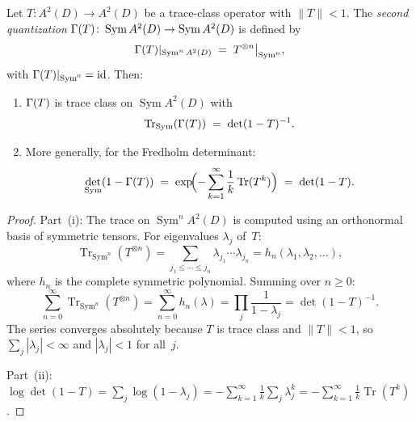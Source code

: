 \begin{proposition}%
\label{prop:thqg-X-second-quantization}%
%
Let $T \colon A^2(D) \to A^2(D)$ be a trace-class operator
with $\|T\| < 1$. The \emph{second quantization}
$\Gamma(T) \colon \operatorname{Sym} A^2(D) \to
\operatorname{Sym} A^2(D)$ is defined by
\begin{equation}\label{eq:thqg-X-second-quant}
\Gamma(T)|_{\operatorname{Sym}^n A^2(D)}
\;=\;
T^{\otimes n}\big|_{\operatorname{Sym}^n},
\end{equation}
with $\Gamma(T)|_{\operatorname{Sym}^0} = \mathrm{id}$.
Then:
\begin{enumerate}[label=\textup{(\roman*)}]
\item $\Gamma(T)$ is trace class on $\operatorname{Sym} A^2(D)$
 with
 \begin{equation}\label{eq:thqg-X-second-quant-trace}
 \operatorname{Tr}_{\operatorname{Sym}}(\Gamma(T))
 \;=\;
 \det(1 - T)^{-1}.
 \end{equation}
\item More generally, for the Fredholm determinant:
 \begin{equation}\label{eq:thqg-X-fredholm-second-quant}
 \det_{\operatorname{Sym}}(1 - \Gamma(T))
 \;=\;
 \exp\!\Bigl(-\sum_{k=1}^{\infty}
 \frac{1}{k}\operatorname{Tr}(T^k)\Bigr)
 \;=\;
 \det(1 - T).
 \end{equation}
\end{enumerate}
\end{proposition}

\begin{proof}
Part~(i): The trace on $\operatorname{Sym}^n A^2(D)$ is computed
using an orthonormal basis of symmetric tensors.
For eigenvalues $\lambda_j$ of~$T$:
\[
\operatorname{Tr}_{\operatorname{Sym}^n}(T^{\otimes n})
= \sum_{j_1 \leq \cdots \leq j_n}
\lambda_{j_1} \cdots \lambda_{j_n}
= h_n(\lambda_1, \lambda_2, \ldots),
\]
where $h_n$ is the complete symmetric polynomial.
Summing over $n \geq 0$:
\[
\sum_{n=0}^{\infty}
\operatorname{Tr}_{\operatorname{Sym}^n}(T^{\otimes n})
= \sum_{n=0}^{\infty} h_n(\lambda)
= \prod_{j} \frac{1}{1 - \lambda_j}
= \det(1 - T)^{-1}.
\]
The series converges absolutely because $T$ is trace class
and $\|T\| < 1$, so $\sum_j |\lambda_j| < \infty$ and
$|\lambda_j| < 1$ for all~$j$.

Part~(ii): $\log\det(1-T) = \sum_j \log(1-\lambda_j)
= -\sum_{k=1}^{\infty} \frac{1}{k}\sum_j \lambda_j^k
= -\sum_{k=1}^{\infty} \frac{1}{k}\operatorname{Tr}(T^k)$.
\end{proof}

